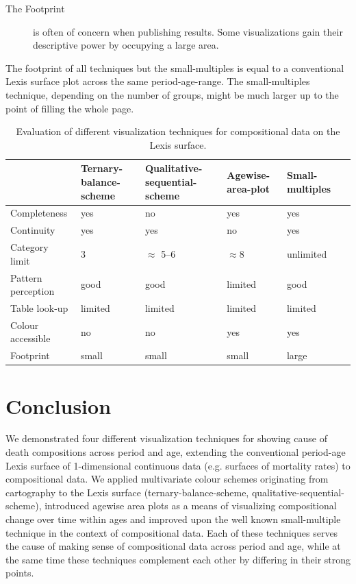 \documentclass[parskip=half]{scrartcl}
\begin{document}
\begin{description}
  \item[The Footprint] is often of concern when publishing results. Some visualizations gain their descriptive power by occupying a large area.
\end{description}

The footprint of all techniques but the small-multiples is equal to a conventional Lexis surface plot across the same period-age-range. The small-multiples technique, depending on the number of groups, might be much larger up to the point of filling the whole page.

\begin{table}[!htb]
\tabformat
\begin{tabular}{p{3.5cm}*5{Q{1.5cm}}}
\toprule
 & Ternary-balance-scheme & Qualitative-sequential-scheme & Agewise-area-plot & Small-multiples \\
\midrule
Completeness & yes & no & yes & yes \\
Continuity & yes & yes & no & yes \\
Category limit & 3 & $\approx$ 5--6 & $\approx 8$ & unlimited \\
Pattern perception & good & good & limited & good \\
Table look-up & limited & limited & limited & limited \\
Colour accessible & no & no & yes & yes \\
Footprint & small & small & small & large \\
\bottomrule
\end{tabular}
\caption{Evaluation of different visualization techniques for compositional data on the Lexis surface.}
\label{tab:eval}
\end{table}

\clearpage

\section{Conclusion} %
\label{sec:con}

We demonstrated four different visualization techniques for showing cause of death compositions across period and age, extending the conventional period-age Lexis surface of 1-dimensional continuous data (e.g. surfaces of mortality rates) to compositional data. We applied multivariate colour schemes originating from cartography to the Lexis surface (ternary-balance-scheme, qualitative-sequential-scheme), introduced agewise area plots as a means of visualizing compositional change over time within ages and improved upon the well known small-multiple technique in the context of compositional data. Each of these techniques serves the cause of making sense of compositional data across period and age, while at the same time these techniques complement each other by differing in their strong points.
\end{document}
